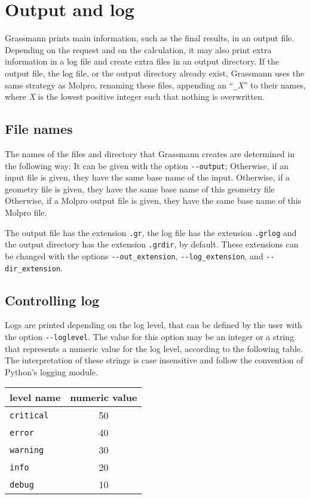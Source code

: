 \hypertarget{chap:output}{}
\chapter{Output and log}
\label{sec:output}
\chapterauthor{}


Grassmann prints main information, such as the final results, in an output file.
Depending on the request and on the calculation,
it may also print extra information in a log file and create extra files in an output directory.
If the output file, the log file, or the output directory already exist,
Grassmann uses the same strategy as Molpro,
renaming these files, appending an ``\verb+_+\emph{X}'' to their names,
where \emph{X} is the lowest positive integer such that nothing is overwritten.

\section{File names}

The names of the files and directory that Grassmann creates
are determined in the following way:
It can be given with the option \verb+--output+;
Otherwise, if an input file is given, they have the same base name of the input.
Otherwise, if a geometry file is given,
they have the same base name of this geometry file
Otherwise, if a Molpro output file is given,
they have the same base name of this Molpro file.

The output file has the extension \verb+.gr+,
the log file has the extension \verb+.grlog+
and the output directory has the extension \verb+.grdir+, by default.
These extensions can be changed with the options \verb+--out_extension+,
\verb+--log_extension+, and \verb+--dir_extension+.

\section{Controlling log}

Logs are printed depending on the log level,
that can be defined by the user with the option \verb+--loglevel+.
The value for this option may be an integer
or a string that represents a numeric value for the log level,
according to the following table.
The interpretation of these strings is case insensitive
and follow the convention of Python's logging module.

\begin{center}
  \begin{tabular}{lc}
    \hline
    level name & numeric value\\
    \hline
    \verb+critical+ & 50 \\
    \verb+error+ & 40\\
    \verb+warning+ & 30\\
    \verb+info+ & 20\\
    \verb+debug+& 10\\
    \hline
  \end{tabular}
\end{center}

